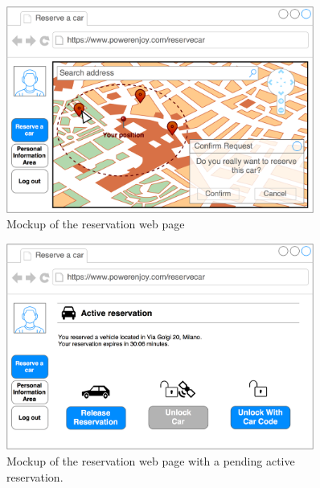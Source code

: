 \begin{figure}[H]
\begin{center}
		\includegraphics[width=0.9\textwidth]{./specific_requirements/features/diagrams/web_reserve_car.png}
		\caption{Mockup of the reservation web page}
		\label{web_reserve_car}
\end{center}
\end{figure}

\begin{figure}[H]
\begin{center}
		\includegraphics[width=0.9\textwidth]{./specific_requirements/features/diagrams/web_recap_reserv.png}
		\caption{Mockup of the reservation web page with a pending active reservation.}
		\label{web_recap_reserv}
\end{center}
\end{figure}